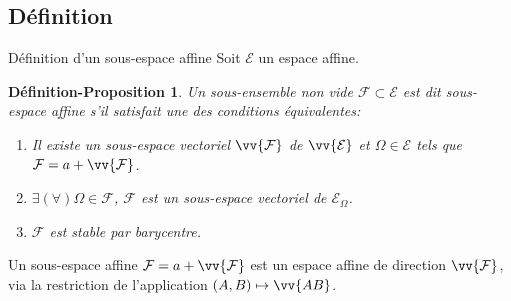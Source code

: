 \documentclass[aspectratio=1610 %
]{beamer}
\newtheorem{defprop}[theorem]{Définition-Proposition}
\let\ens\mathcal
\begin{document}
\subsection{Définition}
  \begin{frame}{Définition d'un sous-espace affine}
      Soit $\ens{E}$ un espace affine.
      \begin{defprop}
      Un sous-ensemble non vide $\ens{F} \subset \ens{E}$ est dit \alert{sous-espace affine} s'il satisfait une des conditions équivalentes:
      \begin{enumerate}[<+(1)->]
        \item Il existe un sous-espace vectoriel $\vv{\ens{F}}$ de $\vv{\ens{E}}$ et $\Omega \in \ens{E}$ tels que $\ens{F}=a+\vv{\ens{F}}$.
        \item $\exists (\forall)\Omega \in \ens{F}$, $\ens{F}$ est un sous-espace vectoriel de $\ens{E}_{\Omega}$.
        \item $\ens{F}$ est stable par barycentre.
      \end{enumerate}
    \end{defprop}\pause
    Un sous-espace affine $\ens{F}=a+\vv{\ens{F}}$ est un espace affine de direction $\vv{\ens{F}}$, via la restriction de l'application $(A,B)\mapsto\vv{AB}$.
  \end{frame}
\end{document}
